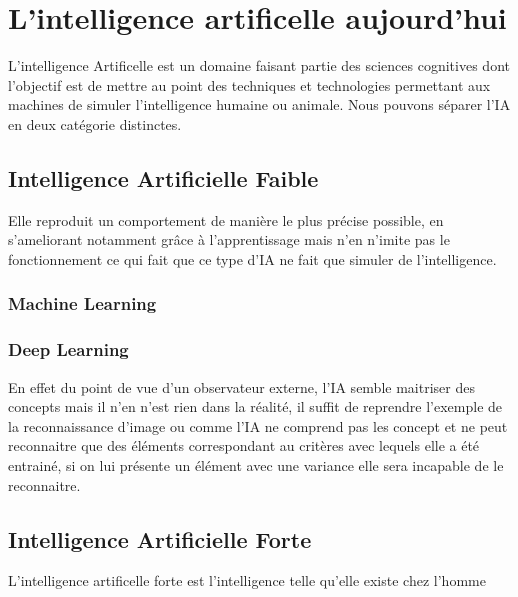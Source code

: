 
\chapter{L'intelligence artificelle aujourd'hui}
L'intelligence Artificelle est un domaine faisant partie 
des sciences cognitives dont l'objectif est de mettre au
point des techniques et technologies permettant aux 
machines de simuler l'intelligence humaine ou animale.
Nous pouvons séparer l'IA en deux catégorie distinctes. 

\section{Intelligence Artificielle Faible}
Elle reproduit un comportement de manière le plus précise possible,
en s'ameliorant notamment grâce à l'apprentissage 
mais n'en n'imite pas le fonctionnement ce qui fait que
ce type d'IA ne fait que simuler de l'intelligence. \newline

\subsection{Machine Learning}
\subsection{Deep Learning}

En effet du point de vue d'un observateur externe, l'IA 
semble maitriser des concepts mais il n'en n'est rien dans la 
réalité, il suffit de reprendre l'exemple de la reconnaissance d'image
ou comme l'IA ne comprend pas les concept et ne peut reconnaitre 
que des éléments correspondant au critères avec lequels elle a été 
entrainé, si on lui présente un élément avec une variance elle 
sera incapable de le reconnaitre. 
    
\section{Intelligence Artificielle Forte}
L'intelligence artificelle forte est l'intelligence
telle qu'elle existe chez l'homme


